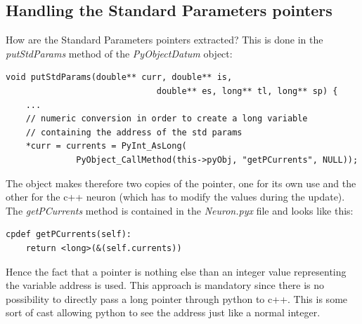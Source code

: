 \documentclass{article}
\begin{document}
\subsection{Handling the Standard Parameters pointers}
How are the Standard Parameters pointers extracted? This is done in the \emph{putStdParams} method of the \emph{PyObjectDatum} object:
\begin{verbatim}
void putStdParams(double** curr, double** is, 
                              double** es, long** tl, long** sp) {
    ...
	// numeric conversion in order to create a long variable 
	// containing the address of the std params 
	*curr = currents = PyInt_AsLong(
	          PyObject_CallMethod(this->pyObj, "getPCurrents", NULL));
\end{verbatim}
The object makes therefore two copies of the pointer, one for its own use and the other for the c++ neuron (which has to modify the values during the update). The \emph{getPCurrents} method is contained in the \emph{Neuron.pyx} file and looks like this:
\begin{verbatim}
cpdef getPCurrents(self):
    return <long>(&(self.currents))
\end{verbatim}
Hence the fact that a pointer is nothing else than an integer value representing the variable address is used. This approach is mandatory since there is no possibility to directly pass a long pointer through python to c++. This is some sort of cast allowing python to see the address just like a normal integer.
\end{document}
